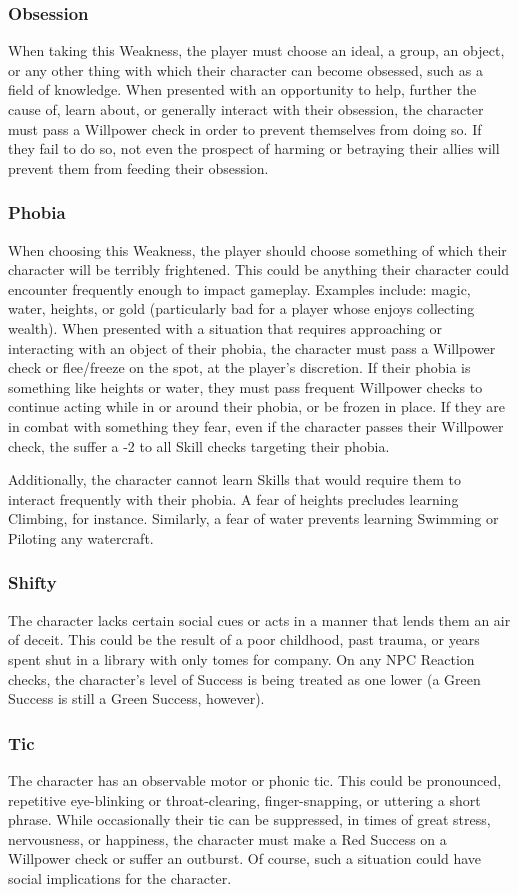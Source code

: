 \documentclass[oneside]{book}
\begin{document}
\begin{multicols}{2}
\subsubsection{Obsession}
When taking this Weakness, the player must choose an ideal, a group, an object, or any other thing with which their character can become obsessed, such as a field of knowledge. When presented with an opportunity to help, further the cause of, learn about, or generally interact with their obsession, the character must pass a Willpower check in order to prevent themselves from doing so. If they fail to do so, not even the prospect of harming or betraying their allies will prevent them from feeding their obsession. 
\subsubsection{Phobia}
When choosing this Weakness, the player should choose something of which their character will be terribly frightened. This could be anything their character could encounter frequently enough to impact gameplay. Examples include: magic, water, heights, or gold (particularly bad for a player whose enjoys collecting wealth). When presented with a situation that requires approaching or interacting with an object of their phobia, the character must pass a Willpower check or flee/freeze on the spot, at the player's discretion. If their phobia is something like heights or water, they must pass frequent Willpower checks to continue acting while in or around their phobia, or be frozen in place. If they are in combat with something they fear, even if the character passes their Willpower check, the suffer a -2 to all Skill checks targeting their phobia.

Additionally, the character cannot learn Skills that would require them to interact frequently with their phobia. A fear of heights precludes learning Climbing, for instance. Similarly, a fear of water prevents learning Swimming or Piloting any watercraft. 
\subsubsection{Shifty}
The character lacks certain social cues or acts in a manner that lends them an air of deceit. This could be the result of a poor childhood, past trauma, or years spent shut in a library with only tomes for company. On any NPC Reaction checks, the character's level of Success is being treated as one lower (a Green Success is still a Green Success, however). 
\subsubsection{Tic}
The character has an observable motor or phonic tic. This could be pronounced, repetitive eye-blinking or throat-clearing, finger-snapping, or uttering a short phrase. While occasionally their tic can be suppressed, in times of great stress, nervousness, or happiness, the character must make a Red Success on a Willpower check or suffer an outburst. Of course, such a situation could have social implications for the character. 

\end{multicols}
\end{document}
